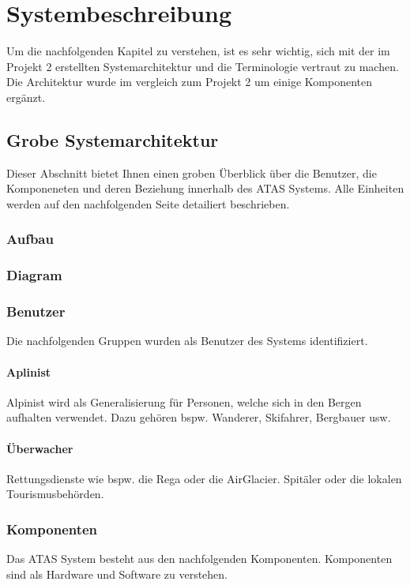 \documentclass[11pt,english,german]{report}
\theoremstyle{definition}
\begin{document}
\chapter{Systembeschreibung}
Um die nachfolgenden Kapitel zu verstehen, ist es sehr wichtig, sich mit der im Projekt 2 erstellten Systemarchitektur und die Terminologie vertraut zu machen. Die Architektur wurde im vergleich zum Projekt 2 um einige Komponenten ergänzt.

\section{Grobe Systemarchitektur}
Dieser Abschnitt bietet Ihnen einen groben Überblick über die Benutzer, die Komponeneten und deren Beziehung innerhalb des ATAS Systems. Alle Einheiten werden auf den nachfolgenden Seite detailiert beschrieben.

\newpage
\subsection{Aufbau}
\subsection{Diagram}

\subsection{Benutzer}
Die nachfolgenden Gruppen wurden als Benutzer des Systems identifiziert.
\subsubsection{Aplinist}
Alpinist wird als Generalisierung für Personen, welche sich in den Bergen aufhalten verwendet. Dazu gehören bspw. Wanderer, Skifahrer, Bergbauer usw.
\subsubsection{Überwacher}
Rettungsdienste wie bspw. die Rega oder die AirGlacier. Spitäler oder die lokalen Tourismusbehörden.

\subsection{Komponenten}
Das ATAS System besteht aus den nachfolgenden Komponenten. Komponenten sind als Hardware und Software zu verstehen.
\end{document}
